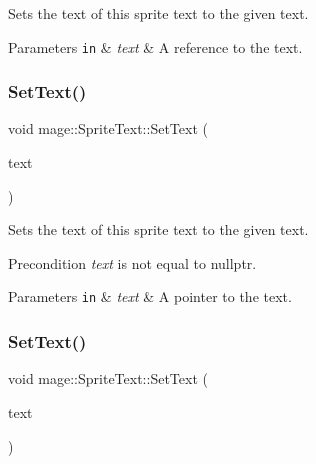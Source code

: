Sets the text of this sprite text to the given text.


\begin{DoxyParams}[1]{Parameters}
\mbox{\tt in}  & {\em text} & A reference to the text. \\
\hline
\end{DoxyParams}
\hypertarget{classmage_1_1_sprite_text_a03d5012e2812d422a1285a4a0abb104f}{}\label{classmage_1_1_sprite_text_a03d5012e2812d422a1285a4a0abb104f} 
\subsubsection{\texorpdfstring{Set\+Text()}{SetText()}\hspace{0.1cm}{\footnotesize\ttfamily [2/3]}}
{\footnotesize\ttfamily void mage\+::\+Sprite\+Text\+::\+Set\+Text (\begin{DoxyParamCaption}\item[{const wchar\+\_\+t $\ast$}]{text }\end{DoxyParamCaption})}

Sets the text of this sprite text to the given text.

\begin{DoxyPrecond}{Precondition}
{\itshape text} is not equal to {\ttfamily nullptr}. 
\end{DoxyPrecond}

\begin{DoxyParams}[1]{Parameters}
\mbox{\tt in}  & {\em text} & A pointer to the text. \\
\hline
\end{DoxyParams}
\hypertarget{classmage_1_1_sprite_text_ab9f28cf44b29b8489794938a8965f104}{}\label{classmage_1_1_sprite_text_ab9f28cf44b29b8489794938a8965f104} 
\subsubsection{\texorpdfstring{Set\+Text()}{SetText()}\hspace{0.1cm}{\footnotesize\ttfamily [3/3]}}
{\footnotesize\ttfamily void mage\+::\+Sprite\+Text\+::\+Set\+Text (\begin{DoxyParamCaption}\item[{const \hyperlink{structmage_1_1_sprite_text_item}{Sprite\+Text\+Item} \&}]{text }\end{DoxyParamCaption})}


